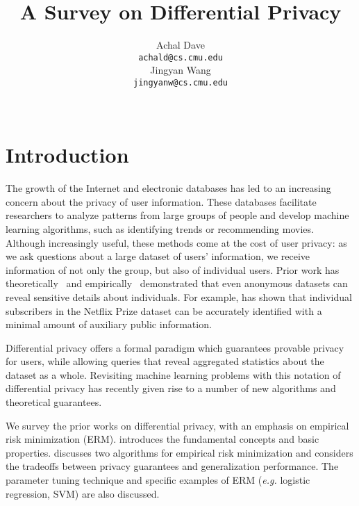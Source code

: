 \documentclass{article} %
\title{A Survey on Differential Privacy}
\author{
Achal Dave \\
\texttt{achald@cs.cmu.edu} \\
\And
Jingyan Wang \\
\texttt{jingyanw@cs.cmu.edu} \\
\\
}
\begin{document}
\maketitle
%


\section{Introduction}
The growth of the Internet and electronic databases has led to an increasing
concern about the privacy of user information. These databases facilitate
researchers to analyze patterns from large groups of people and develop machine
learning algorithms, such as identifying trends or recommending movies. Although
increasingly useful, these methods come at the cost of user privacy: as we ask
questions about a large dataset of users' information, we receive information of
not only the group, but also of individual users. Prior work has
theoretically~\cite{ganta2008composition} and
empirically~\cite{sweeney1997weaving} demonstrated that even anonymous datasets
can reveal sensitive details about individuals. For example,
\cite{narayanan2008robust} has shown that individual subscribers in the Netflix
Prize dataset can be accurately identified with a minimal amount of auxiliary
public information.

Differential privacy offers a formal paradigm which guarantees provable privacy
for users, while allowing queries that reveal aggregated statistics about the
dataset as a whole. Revisiting machine learning problems with this notation of
differential privacy has recently given rise to a number of new algorithms and
theoretical guarantees.

We survey the prior works on differential privacy, with an emphasis on empirical
risk minimization (ERM).  introduces the fundamental
concepts and basic properties.  discusses two
algorithms for empirical risk minimization and considers the tradeoffs between
privacy guarantees and generalization performance. The parameter tuning
technique and specific examples of ERM (\emph{e.g.} logistic regression, SVM)
are also discussed.
\end{document}
